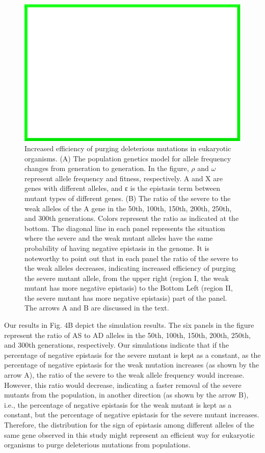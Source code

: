 \begin{figure}
\centering
\includegraphics[width=\textwidth]{dummy}
\caption{Increased efficiency of purging deleterious mutations in
eukaryotic organisms. (A) The population genetics model for allele
frequency changes from generation to generation. In the figure, $\rho$
and $\omega$ represent allele frequency and fitness, respectively. A
and X are genes with different alleles, and ε is the epistasis term
between mutant types of different genes. (B) The ratio of the severe
to the weak alleles of the A gene in the 50th, 100th, 150th, 200th,
250th, and 300th generations. Colors represent the ratio as indicated
at the bottom. The diagonal line in each panel represents the
situation where the severe and the weak mutant alleles have the same
probability of having negative epistasis in the genome. It is
noteworthy to point out that in each panel the ratio of the severe to
the weak alleles decreases, indicating increased efficiency of purging
the severe mutant allele, from the upper right (region I, the weak
mutant has more negative epistasis) to the Bottom Left (region II, the
severe mutant has more negative epistasis) part of the panel. The
arrows A and B are discussed in the text.}
\end{figure}

Our results in Fig. 4B depict the simulation results. The six panels
in the figure represent the ratio of AS to AD alleles in the 50th,
100th, 150th, 200th, 250th, and 300th generations, respectively. Our
simulations indicate that if the percentage of negative epistasis for
the severe mutant is kept as a constant, as the percentage of negative
epistasis for the weak mutation increases (as shown by the arrow A),
the ratio of the severe to the weak allele frequency would
increase. However, this ratio would decrease, indicating a faster
removal of the severe mutants from the population, in another
direction (as shown by the arrow B), i.e., the percentage of negative
epistasis for the weak mutant is kept as a constant, but the
percentage of negative epistasis for the severe mutant
increases. Therefore, the distribution for the sign of epistasis among
different alleles of the same gene observed in this study might
represent an efficient way for eukaryotic organisms to purge
deleterious mutations from populations.

